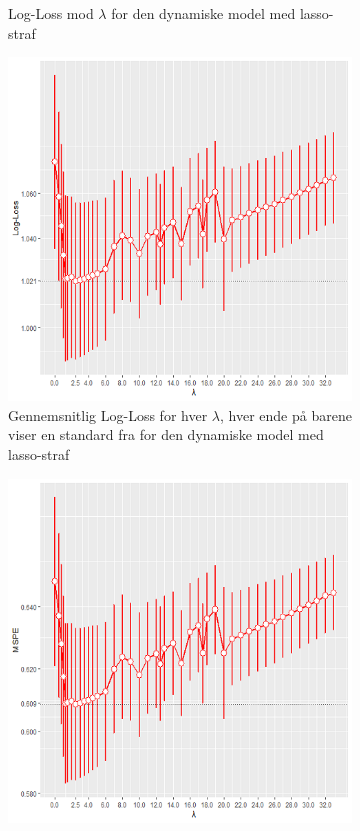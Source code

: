 \documentclass[11pt,a4paper]{article}
\begin{document}
\begin{figure}[h!]
\begin{subfigure}[b]{0.425\linewidth}
    \caption{Log-Loss mod $\lambda$ for den dynamiske model med lasso-straf}
    \label{fig:DynLogLossLine}  
    \end{subfigure}
  \begin{subfigure}[b]{0.425\linewidth}
    \includegraphics[width=\textwidth]{LOGMSD1.png}
    \caption{Gennemsnitlig Log-Loss for hver $\lambda$, hver ende på barene viser en standard fra  for den dynamiske model med lasso-straf}
    \label{fig:LogLossBarDyn}    
    \end{subfigure}
  \begin{subfigure}[b]{0.425\linewidth}
    \includegraphics[width=\textwidth]{MSBD1.png}

\end{subfigure}
\end{figure}
\end{document}

